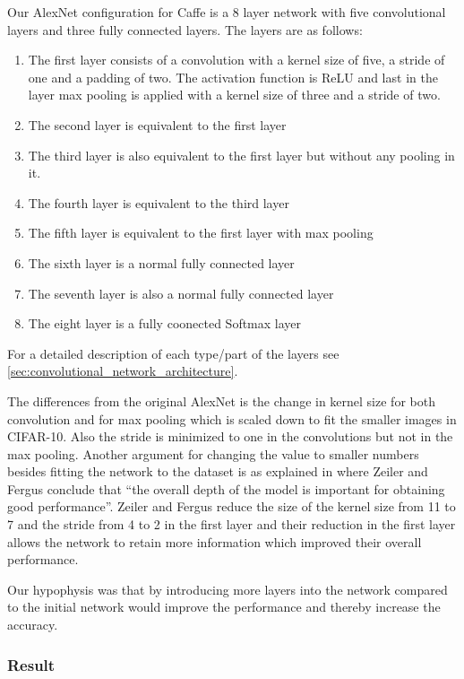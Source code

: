 Our AlexNet configuration for Caffe is a 8 layer network with five convolutional
layers and three fully connected layers. The layers are as follows:
\begin{enumerate}
	\item The first layer consists of a convolution with a kernel size of five, a
	stride of one and a padding of two. The activation function is ReLU and last in
	the layer max pooling is applied with a kernel size of three and a stride of
	two. 
	\item The second layer is equivalent to the first layer 
	\item The third layer is also equivalent to the first layer but without any
	pooling in it. 
	\item The fourth layer is equivalent to the third layer 
	\item The fifth layer is equivalent to the first layer with max pooling  
	\item The sixth layer is a normal fully connected layer
	\item The seventh layer is also a normal fully connected layer
	\item The eight layer is a fully coonected Softmax layer
\end{enumerate}

For a detailed description of each type/part of the layers see
\autoref{sec:convolutional_network_architecture}. 


The differences from the original AlexNet is the change in kernel size for both
convolution and for max pooling which is scaled down to fit the smaller
images in CIFAR-10. Also the stride is minimized to one in the convolutions but
not in the max pooling. Another argument for changing the value to smaller
numbers besides fitting the network to the dataset is as explained in
\cite{ZeilerFergus} where Zeiler and Fergus conclude that ``the overall depth of
the model is important for obtaining good performance''.  Zeiler and
Fergus\cite{ZeilerFergus} reduce the size of the kernel size from 11 to 7 and
the stride from 4 to 2 in the first layer and their reduction in the first layer
allows the network to retain more information which improved their overall
performance. 


Our hypophysis was that by introducing more layers into the network compared to
the initial network would improve the performance and thereby increase the
accuracy.


\subsubsection{Result}

